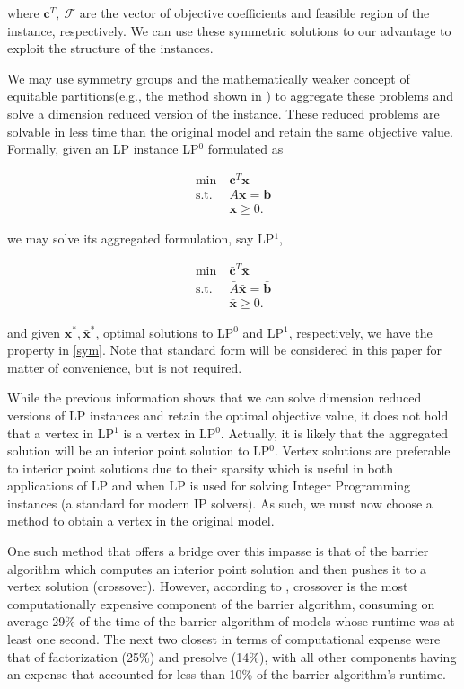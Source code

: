 \documentclass[runningheads]{llncs}
\newcommand{\cF}{{\mathcal F}}
\renewcommand{\vec}[1]{\mathbf{#1}}
\numberwithin{defn}{section} %
\begin{document}
\noindent
where $\vec{c}^T, \ \cF$ are the vector of objective coefficients and feasible region of the instance, respectively.  We can use these symmetric solutions to our advantage to exploit the structure of the instances.

We may use symmetry groups and the mathematically weaker concept of equitable partitions(e.g., the method shown in  \cite{grohe2014dimension}) to aggregate these problems and solve a dimension reduced version of the instance.    These reduced problems are solvable in less time than the original model and retain the same objective value.  Formally, given an LP instance LP$^0$ formulated as 

\begin{align}
\label{stdLP}  \min \ &\vec{c}^T\vec{x}  \nonumber \\
\mbox{s.t. } & A\vec{x} = \vec{b}\\
& \vec{x} \geq 0. \nonumber
\end{align}

we may solve its aggregated formulation, say LP$^1$,

\begin{align}
\label{stdLPagg}  \min \ &\bar{\vec{c}}^T\bar{\vec{x}}  \nonumber \\
\mbox{s.t. } & \bar{A}\bar{\vec{x}} = \bar{\vec{b}}\\
& \bar{\vec{x}} \geq 0. \nonumber
\end{align}

and given $\vec{x}^*, \bar{\vec{x}}^*$, optimal solutions to LP$^0$ and LP$^1$, respectively, we have the property in \eqref{sym}.  Note that standard form will be considered in this paper for matter of convenience, but is not required. 

While the previous information shows that we can solve dimension reduced versions of LP instances and retain the optimal objective value, it does not hold that a vertex in LP$^1$ is a vertex in LP$^0$.  Actually, it is likely that the aggregated solution will be an interior point solution to LP$^0$.  Vertex solutions are preferable to interior point solutions due to their sparsity which is useful in both applications of LP and when LP is used for solving Integer Programming instances (a standard for modern IP solvers).  As such, we must now choose a method to obtain a vertex in the original model.  

One such method that offers a bridge over this impasse is that of the barrier algorithm which computes an interior point solution and then pushes it to a vertex solution (crossover).  However, according to \cite{gurobi2014crossover}, crossover is the most computationally expensive component of the barrier algorithm, consuming on average 29\% of the time of the barrier algorithm of models whose runtime was at least one second.  The next two closest in terms of computational expense were that of factorization (25\%) and presolve (14\%), with all other components having an expense that accounted for less than 10\% of the barrier algorithm's runtime.
\end{document}
